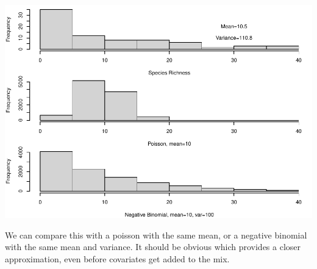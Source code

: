 \documentclass[
]{book}
\begin{document}
\includegraphics{ECOMODbook_files/figure-latex/unnamed-chunk-92-1.pdf}

We can compare this with a poisson with the same mean, or a negative binomial with the same mean and variance. It should be obvious which provides a closer approximation, even before covariates get added to the mix.
\end{document}
